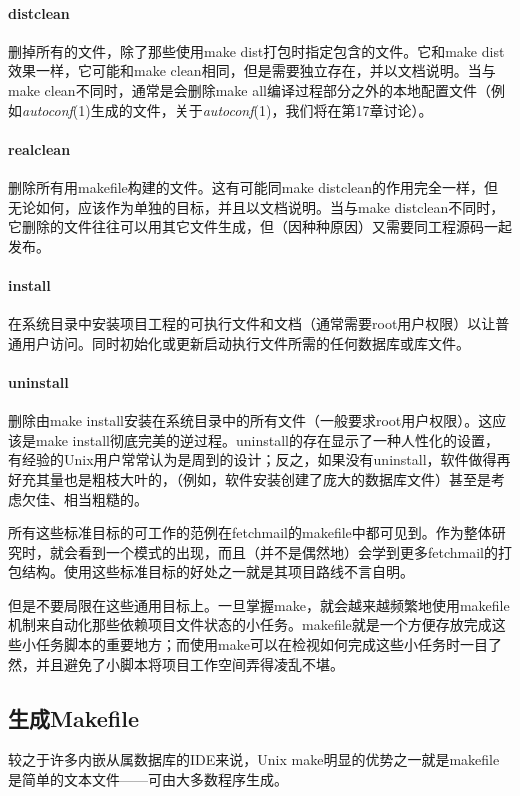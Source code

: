 \documentclass[12pt,oneside]{book}
\begin{document}
\paragraph{distclean}
删掉所有的文件，除了那些使用make dist打包时指定包含的文件。它和make dist效果一样，它可能和make clean相同，但是需要独立存在，并以文档说明。当与make clean不同时，通常是会删除make all编译过程部分之外的本地配置文件（例如\textit{autoconf}(1)生成的文件，关于\textit{autoconf}(1)，我们将在第17章讨论）。

\paragraph{realclean}
删除所有用makefile构建的文件。这有可能同make distclean的作用完全一样，但无论如何，应该作为单独的目标，并且以文档说明。当与make distclean不同时，它删除的文件往往可以用其它文件生成，但（因种种原因）又需要同工程源码一起发布。

\paragraph{install}
在系统目录中安装项目工程的可执行文件和文档（通常需要root用户权限）以让普通用户访问。同时初始化或更新启动执行文件所需的任何数据库或库文件。

\paragraph{uninstall}
删除由make install安装在系统目录中的所有文件（一般要求root用户权限）。这应该是make install彻底完美的逆过程。uninstall的存在显示了一种人性化的设置，有经验的Unix用户常常认为是周到的设计；反之，如果没有uninstall，软件做得再好充其量也是粗枝大叶的，（例如，软件安装创建了庞大的数据库文件）甚至是考虑欠佳、相当粗糙的。

所有这些标准目标的可工作的范例在fetchmail的makefile中都可见到。作为整体研究时，就会看到一个模式的出现，而且（并不是偶然地）会学到更多fetchmail的打包结构。使用这些标准目标的好处之一就是其项目路线不言自明。

但是不要局限在这些通用目标上。一旦掌握make，就会越来越频繁地使用makefile机制来自动化那些依赖项目文件状态的小任务。makefile就是一个方便存放完成这些小任务脚本的重要地方；而使用make可以在检视如何完成这些小任务时一目了然，并且避免了小脚本将项目工作空间弄得凌乱不堪。


\subsection{生成Makefile}
较之于许多内嵌从属数据库的IDE来说，Unix make明显的优势之一就是makefile是简单的文本文件——可由大多数程序生成。
\end{document}
